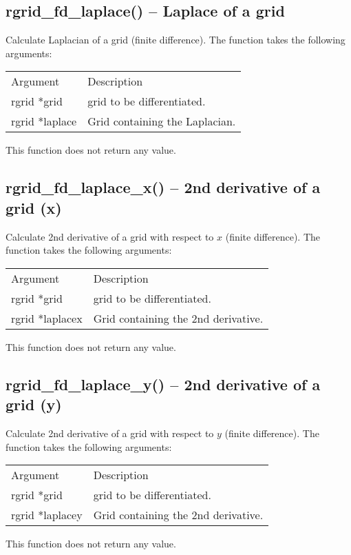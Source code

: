 \documentclass[12pt,letterpaper]{report}
\begin{document}
\subsection{rgrid\_fd\_laplace() -- Laplace of a grid}

Calculate Laplacian of a grid (finite difference). The function takes the following arguments:
\begin{longtable}{p{} p{}}
Argument & Description\\
\cline{1-2}
rgrid *grid & grid to be differentiated.\\
rgrid *laplace & Grid containing the Laplacian.\\
\end{longtable}
\noindent
This function does not return any value.

\subsection{rgrid\_fd\_laplace\_x() -- 2nd derivative of a grid (x)}

Calculate 2nd derivative of a grid with respect to $x$ (finite difference). The function takes the following arguments:
\begin{longtable}{p{} p{}}
Argument & Description\\
\cline{1-2}
rgrid *grid & grid to be differentiated.\\
rgrid *laplacex & Grid containing the 2nd derivative.\\
\end{longtable}
\noindent
This function does not return any value.

\subsection{rgrid\_fd\_laplace\_y() -- 2nd derivative of a grid (y)}

Calculate 2nd derivative of a grid with respect to $y$ (finite difference). The function takes the following arguments:
\begin{longtable}{p{} p{}}
Argument & Description\\
\cline{1-2}
rgrid *grid & grid to be differentiated.\\
rgrid *laplacey & Grid containing the 2nd derivative.\\
\end{longtable}
\noindent
This function does not return any value.
\end{document}
